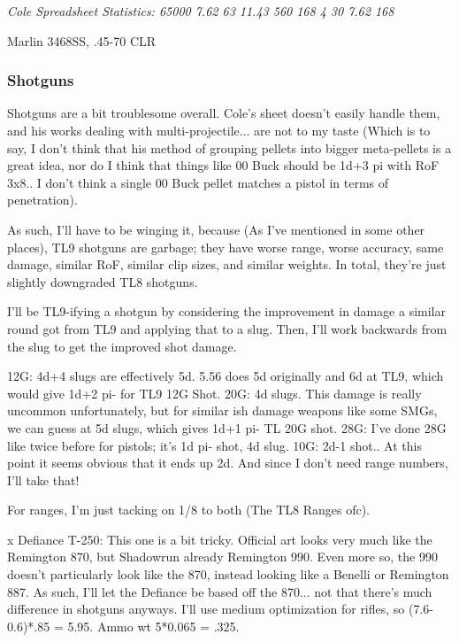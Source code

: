 \begin{multicols*}{2}
	\textit{\textcolor{OliveGreen}{Cole Spreadsheet Statistics: 65000 7.62 63 11.43 560 168 4 30 7.62 168}}
	
	
	Marlin 3468SS, .45-70 CLR
	
	
	\subsubsection{Shotguns}
	
	Shotguns are a bit troublesome overall. Cole's sheet doesn't easily handle them, and his works dealing with multi-projectile... are not to my taste (Which is to say, I don't think that his method of grouping pellets into bigger meta-pellets is a great idea, nor do I think that things like 00 Buck should be 1d+3 pi with RoF 3x8.. I don't think a single 00 Buck pellet matches a pistol in terms of penetration). 
	
	As such, I'll have to be winging it, because (As I've mentioned in some other places), TL9 shotguns are garbage; they have worse range, worse accuracy, same damage, similar RoF, similar clip sizes, and similar weights. In total, they're just slightly downgraded TL8 shotguns. 
	
	I'll be TL9-ifying a shotgun by considering the improvement in damage a similar round got from TL9 and applying that to a slug. Then, I'll work backwards from the slug to get the improved shot damage. 
	
	12G: 4d+4 slugs are effectively 5d. 5.56 does 5d originally and 6d at TL9, which would give 1d+2 pi- for TL9 12G Shot.
	20G: 4d slugs. This damage is really uncommon unfortunately, but for similar ish damage weapons like some SMGs, we can guess at 5d slugs, which gives 1d+1 pi- TL 20G shot.
	28G: I've done 28G like twice before for pistols; it's 1d pi- shot, 4d slug.
	10G: 2d-1 shot.. At this point it seems obvious that it ends up 2d. And since I don't need range numbers, I'll take that!
	
	For ranges, I'm just tacking on 1/8 to both (The TL8 Ranges ofc).
	
	x Defiance T-250: This one is a bit tricky. Official art looks very much like the Remington 870, but Shadowrun already Remington 990. Even more so, the 990 doesn't particularly look like the 870, instead looking like a Benelli or Remington 887. As such, I'll let the Defiance be based off the 870... not that there's much difference in shotguns anyways. I'll use medium optimization for rifles, so (7.6-0.6)*.85 = 5.95. Ammo wt 5*0.065 = .325.
	

\end{multicols*}
